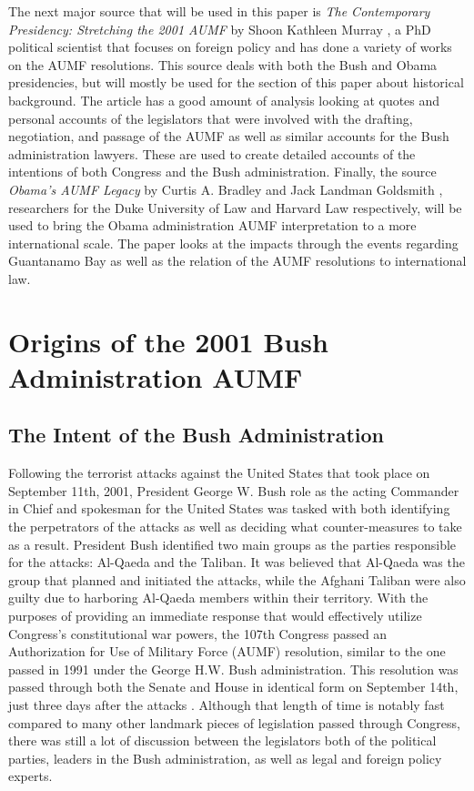 \documentclass[12pt]{article}
\begin{document}
The next major source that will be used in this paper is \textit{The Contemporary Presidency: Stretching the 2001 AUMF} by Shoon Kathleen Murray \autocite{murray2015}, a PhD political scientist that focuses on foreign policy and has done a variety of works on the AUMF resolutions.
This source deals with both the Bush and Obama presidencies, but will mostly be used for the section of this paper about historical background.
The article has a good amount of analysis looking at quotes and personal accounts of the legislators that were involved with the drafting, negotiation, and passage of the AUMF as well as similar accounts for the Bush administration lawyers.
These are used to create detailed accounts of the intentions of both Congress and the Bush administration.
Finally, the source \textit{Obama's AUMF Legacy} by Curtis A. Bradley and Jack Landman Goldsmith \autocite{bradley2016}, researchers for the Duke University of Law and Harvard Law respectively, will be used to bring the Obama administration AUMF interpretation to a more international scale.
The paper looks at the impacts through the events regarding Guantanamo Bay as well as the relation of the AUMF resolutions to international law.

\section*{Origins of the 2001 Bush Administration AUMF}
\subsection*{The Intent of the Bush Administration}
Following the terrorist attacks against the United States that took place on September 11th, 2001, President George W. Bush role as the acting Commander in Chief and spokesman for the United States was tasked with both identifying the perpetrators of the attacks as well as deciding what counter-measures to take as a result.
President Bush identified two main groups as the parties responsible for the attacks: Al-Qaeda and the Taliban.
It was believed that Al-Qaeda was the group that planned and initiated the attacks, while the Afghani Taliban were also guilty due to harboring Al-Qaeda members within their territory.
With the purposes of providing an immediate response that would effectively utilize Congress's constitutional war powers, the 107th Congress passed an Authorization for Use of Military Force (AUMF) resolution, similar to the one passed in 1991 under the George H.W. Bush administration.
This resolution was passed through both the Senate and House in identical form on September 14th, just three days after the attacks \autocite{zotero-165}.
Although that length of time is notably fast compared to many other landmark pieces of legislation passed through Congress, there was still a lot of discussion between the legislators both of the political parties, leaders in the Bush administration, as well as legal and foreign policy experts.
\end{document}
